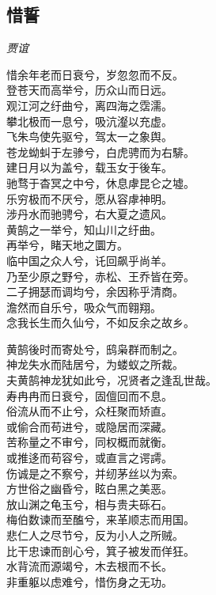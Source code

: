 \documentclass[]{article}
\begin{document}
\hypertarget{header-n2969}{%
\subsection{惜誓}\label{header-n2969}}

\emph{贾谊}

惜余年老而日衰兮，岁忽忽而不反。\\
登苍天而高举兮，历众山而日远。\\
观江河之纡曲兮，离四海之霑濡。\\
攀北极而一息兮，吸沆瀣以充虚。\\
飞朱鸟使先驱兮，驾太一之象舆。\\
苍龙蚴虯于左骖兮，白虎骋而为右騑。\\
建日月以为盖兮，载玉女于後车。\\
驰骛于杳冥之中兮，休息虖昆仑之墟。\\
乐穷极而不厌兮，愿从容虖神明。\\
涉丹水而驰骋兮，右大夏之遗风。\\
黄鹄之一举兮，知山川之纡曲。\\
再举兮，睹天地之圜方。\\
临中国之众人兮，讬回飙乎尚羊。\\
乃至少原之野兮，赤松、王乔皆在旁。\\
二子拥瑟而调均兮，余因称乎清商。\\
澹然而自乐兮，吸众气而翱翔。\\
念我长生而久仙兮，不如反余之故乡。

黄鹄後时而寄处兮，鸱枭群而制之。\\
神龙失水而陆居兮，为蝼蚁之所裁。\\
夫黄鹄神龙犹如此兮，况贤者之逢乱世哉。\\
寿冉冉而日衰兮，固儃回而不息。\\
俗流从而不止兮，众枉聚而矫直。\\
或偷合而苟进兮，或隐居而深藏。\\
苦称量之不审兮，同权概而就衡。\\
或推迻而苟容兮，或直言之谔謣。\\
伤诚是之不察兮，并纫茅丝以为索。\\
方世俗之幽昏兮，眩白黑之美恶。\\
放山渊之龟玉兮，相与贵夫砾石。\\
梅伯数谏而至醢兮，来革顺志而用国。\\
悲仁人之尽节兮，反为小人之所贼。\\
比干忠谏而剖心兮，箕子被发而佯狂。\\
水背流而源竭兮，木去根而不长。\\
非重躯以虑难兮，惜伤身之无功。
\end{document}
